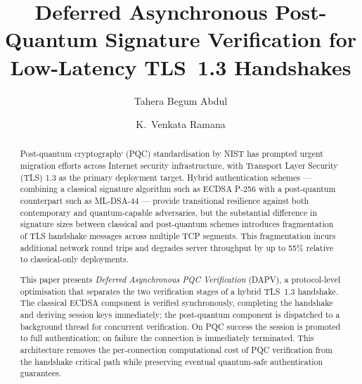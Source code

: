 \documentclass[preprint,10pt,3p]{elsarticle}
\begin{document}
\begin{frontmatter}

\title{Deferred Asynchronous Post-Quantum Signature Verification for
Low-Latency TLS~1.3 Handshakes}




\author[au1]{Tahera Begum Abdul}

\author[au1]{K.~Venkata Ramana}


\address[au1]{Department of Computer Science and Systems Engineering,
Andhra University, Visakhapatnam, Andhra Pradesh, India}


\begin{abstract}
Post-quantum cryptography (PQC) standardisation by NIST has prompted urgent
migration efforts across Internet security infrastructure, with Transport Layer
Security (TLS) 1.3 as the primary deployment target.  Hybrid authentication
schemes --- combining a classical signature algorithm such as ECDSA P-256 with a
post-quantum counterpart such as ML-DSA-44 --- provide transitional resilience
against both contemporary and quantum-capable adversaries, but the substantial
difference in signature sizes between classical and post-quantum schemes
introduces fragmentation of TLS handshake messages across multiple TCP segments.
This fragmentation incurs additional network round trips and degrades server
throughput by up to 55\% relative to classical-only deployments.

This paper presents \textit{Deferred Asynchronous PQC Verification} (DAPV), a
protocol-level optimisation that separates the two verification stages of a
hybrid TLS~1.3 handshake.  The classical ECDSA component is verified
synchronously, completing the handshake and deriving session keys immediately;
the post-quantum component is dispatched to a background thread for concurrent
verification.  On PQC success the session is promoted to full authentication;
on failure the connection is immediately terminated.  This architecture removes
the per-connection computational cost of PQC verification from the handshake
critical path while preserving eventual quantum-safe authentication guarantees.


\end{abstract}
\end{frontmatter}
\end{document}
